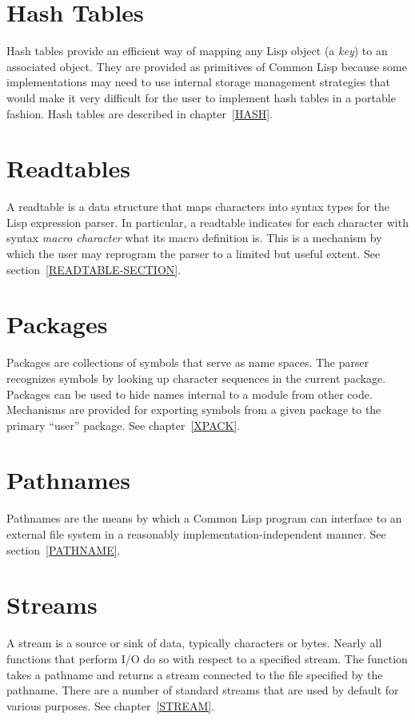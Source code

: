 {\section{Hash Tables}

Hash tables provide an efficient way of mapping any
Lisp object (a {\it key}) to an associated object.
They are provided as primitives of Common Lisp because
some implementations may need to use internal storage
management strategies that would make it very difficult
for the user to implement hash tables in a portable fashion.
Hash tables are described in chapter~\ref{HASH}.

\section{Readtables}

A readtable is a data structure that maps characters into syntax
types for the Lisp expression parser.
In particular, a readtable indicates for
each character with syntax {\it macro character} what its macro
definition is.  This is a mechanism by which the user may reprogram
the parser to a limited but useful extent.
See section~\ref{READTABLE-SECTION}.

\section{Packages}

Packages are collections of symbols that serve as name spaces.
The parser recognizes symbols by looking up character sequences
in the current package.  Packages can be used to hide
names internal to a module from other code.  Mechanisms are provided
for exporting symbols from a given package to the primary ``user'' package.
See chapter~\ref{XPACK}.

\section{Pathnames}
Pathnames are the means by which a Common Lisp program can
interface to an external file system in a reasonably implementation-independent
manner.  See section~\ref{PATHNAME}.

\section{Streams}

A stream is a source or sink of data, typically characters or bytes.
Nearly all functions that perform I/O do so with respect to a specified
stream.  The function  takes a pathname and returns a stream
connected to the file specified by the pathname.
There are a number of standard streams that are used by default for
various purposes.  See chapter~\ref{STREAM}.

}

